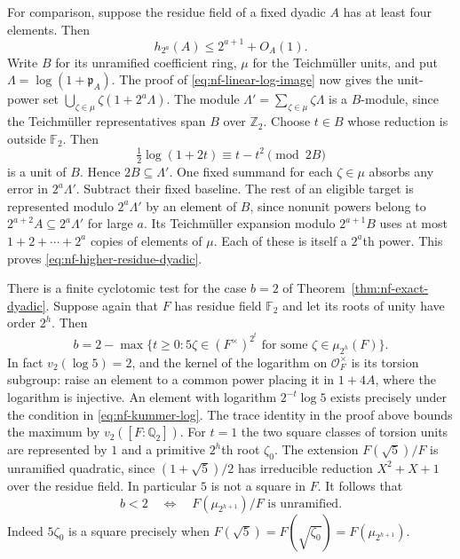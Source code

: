 \documentclass[11pt,letterpaper]{article}
\theoremstyle{definition}
\numberwithin{equation}{section}
\begin{document}
For comparison, suppose the residue field of a fixed dyadic $A$
has at least four elements. Then
\begin{equation}\label{eq:nf-higher-residue-dyadic}
                  h_{2^a}(A)\le2^{a+1}+O_A(1).
\end{equation}
Write $B$ for its unramified coefficient ring, $\mu$ for the Teichm\"uller
units, and put $\Lambda=\log(1+\mathfrak p_A)$.
The proof of \eqref{eq:nf-linear-log-image} now gives the unit-power
set $\bigcup_{\zeta\in\mu}\zeta(1+2^a\Lambda)$. The module
$\Lambda'=\sum_{\zeta\in\mu}\zeta\Lambda$ is a $B$-module, since
the Teichm\"uller representatives span $B$ over $\mathbb Z_2$.
Choose $t\in B$ whose reduction is outside $\mathbb F_2$. Then
\[
    \tfrac12\log(1+2t)\equiv t-t^2\pmod {2B}
\]
is a unit of $B$. Hence $2B\subseteq\Lambda'$. One fixed summand
for each $\zeta\in\mu$ absorbs any error in $2^a\Lambda'$.
Subtract their fixed baseline. The rest of an eligible target
is represented modulo $2^a\Lambda'$ by an element of $B$, since
nonunit powers belong to $2^{a+2}A\subseteq2^a\Lambda'$ for large $a$.
Its Teichm\"uller expansion modulo $2^{a+1}B$ uses at most
$1+2+\cdots+2^a$ copies of elements of $\mu$. Each of these is itself
a $2^a$th power. This proves \eqref{eq:nf-higher-residue-dyadic}.

There is a finite cyclotomic test for the case $b=2$ of
Theorem~\ref{thm:nf-exact-dyadic}. Suppose again that $F$ has
residue field $\mathbb F_2$ and let its roots of unity have order
$2^h$. Then
\begin{equation}\label{eq:nf-kummer-log}
  b=2-\max\{t\ge0:5\zeta\in(F^\times)^{2^t}
                  \text{ for some }\zeta\in\mu_{2^h}(F)\}.
\end{equation}
In fact $v_2(\log5)=2$, and the kernel of the logarithm on
$\mathcal O_F^\times$ is its torsion subgroup: raise an element
to a common power placing it in $1+4A$, where the logarithm is
injective. An element with logarithm $2^{-t}\log5$ exists precisely
under the condition in \eqref{eq:nf-kummer-log}. The trace identity
in the proof above bounds the maximum by $v_2([F:\mathbb Q_2])$.
For $t=1$ the two square classes of torsion units are represented
by $1$ and a primitive $2^h$th root $\zeta_0$.
The extension $F(\sqrt5)/F$ is unramified quadratic, since
$(1+\sqrt5)/2$ has irreducible reduction $X^2+X+1$ over the
residue field. In particular $5$ is not a square in $F$.
It follows that
\[
 b<2\quad\Longleftrightarrow\quad
 F(\mu_{2^{h+1}})/F\text{ is unramified}.
\]
Indeed $5\zeta_0$ is a square precisely when
$F(\sqrt5)=F(\sqrt{\zeta_0})=F(\mu_{2^{h+1}})$.
\end{document}
